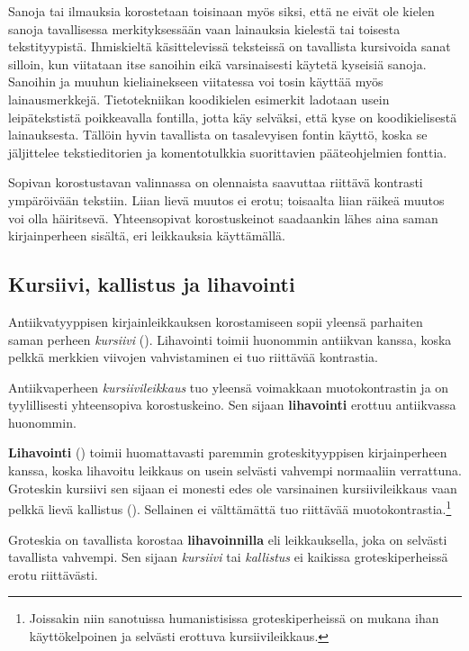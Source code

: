 Sanoja tai ilmauksia korostetaan toisinaan myös siksi, että ne eivät ole
kielen sanoja tavallisessa merkityksessään vaan lainauksia kielestä tai
toisesta tekstityypistä. Ihmiskieltä käsittelevissä teksteissä on
tavallista kursivoida sanat silloin, kun viitataan itse sanoihin eikä
varsinaisesti käytetä kyseisiä sanoja. Sanoihin ja muuhun kieliainekseen
viitatessa voi tosin käyttää myös lainausmerkkejä. Tietotekniikan
koodikielen esimerkit ladotaan usein leipätekstistä poikkeavalla
fontilla, jotta käy selväksi, että kyse on koodikielisestä lainauksesta.
Tällöin hyvin tavallista on tasalevyisen fontin käyttö, koska se
jäljittelee tekstieditorien ja komentotulkkia suorittavien
pääteohjelmien fonttia.

Sopivan korostustavan valinnassa on olennaista saavuttaa riittävä
kontrasti ympäröivään tekstiin. Liian lievä muutos ei erotu; toisaalta
liian räikeä muutos voi olla häiritsevä. Yhteensopivat korostuskeinot
saadaankin lähes aina saman kirjainperheen sisältä, eri leikkauksia
käyttämällä.

\subsection{Kursiivi, kallistus ja lihavointi}
\label{luku:peruskorostukset}

Antiikvatyyppisen kirjainleikkauksen korostamiseen sopii yleensä
parhaiten saman perheen \textit{kursiivi} ().
Lihavointi toimii huonommin antiikvan kanssa, koska pelkkä merkkien
viivojen vahvistaminen ei tuo riittävää kontrastia.

\begin{tulossis}
  \rmfamily Antiikvaperheen \textit{kursiivileikkaus} tuo yleensä
  voimakkaan muotokontrastin ja on tyylillisesti yhteensopiva
  korostuskeino. Sen sijaan \textbf{lihavointi} erottuu antiikvassa
  huonommin.
\end{tulossis}

\textbf{Lihavointi} () toimii huomattavasti paremmin
groteskityyppisen kirjainperheen kanssa, koska lihavoitu leikkaus on
usein selvästi vahvempi normaaliin verrattuna. Groteskin kursiivi sen
sijaan ei monesti edes ole varsinainen kursiivileikkaus vaan pelkkä
lievä kallistus (). Sellainen ei välttämättä tuo
riittävää muotokontrastia.\footnote{Joissakin niin sanotuissa
  humanistisissa groteskiperheissä on mukana ihan käyttökelpoinen ja
  selvästi erottuva kursiivileikkaus.}

\begin{tulossis}
  \sffamily Groteskia on tavallista korostaa \textbf{lihavoinnilla} eli
  leikkauksella, joka on selvästi tavallista vahvempi. Sen sijaan
  \textit{kursiivi} tai \textsl{kallistus} ei kaikissa groteskiperheissä
  erotu riittävästi.
\end{tulossis}

